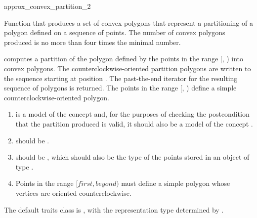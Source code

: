 \begin{ccRefFunction}{approx_convex_partition_2}

\ccDefinition
Function that produces a set of 
convex polygons that represent a partitioning of a polygon defined
on a sequence of points.  The number of convex polygons produced is 
no more than four times the minimal number.%



{
computes a partition of the polygon defined 
by the points in the range [, ) into convex 
polygons. The counterclockwise-oriented partition polygons are written to
the sequence starting at position .  The past-the-end iterator for 
the resulting sequence of polygons is returned.
\ccPrecond The points in the range [, ) define a simple 
counterclockwise-oriented polygon.
}

\begin{enumerate}
    \item {} is a model of the concept 
          and, for the purposes of checking the postcondition that the partition
          produced is valid, it should also be a model of
          the concept %
          .
    \item {} should be .
    \item {} should be ,
          which should also be the type of the points stored in an object
          of type .
    \item Points in the range $[first, beyond)$ must define a simple polygon
          whose vertices are oriented counterclockwise.
\end{enumerate}

The default traits class  is ,
with the representation type determined by .


\end{ccRefFunction}

